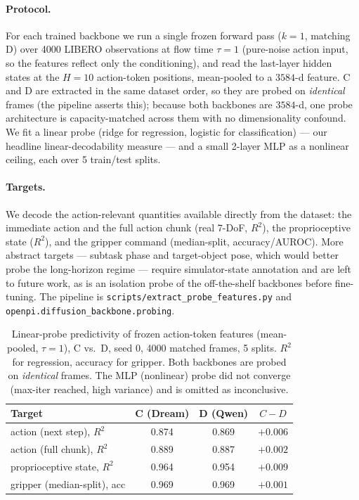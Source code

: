 \documentclass[conference]{IEEEtran}
\begin{document}
\paragraph{Protocol.} For each trained backbone we run a single frozen forward
pass ($k{=}1$, matching D) over 4000 LIBERO observations at flow time $\tau{=}1$
(pure-noise action input, so the features reflect only the conditioning), and read
the last-layer hidden states at the $H{=}10$ action-token positions, mean-pooled
to a $3584$-d feature. C and D are extracted in the same dataset order, so they are
probed on \emph{identical} frames (the pipeline asserts this); because both
backbones are $3584$-d, one probe architecture is capacity-matched across them with
no dimensionality confound. We fit a linear probe (ridge for regression, logistic
for classification) --- our headline linear-decodability measure --- and a small
2-layer MLP as a nonlinear ceiling, each over 5 train/test splits.

\paragraph{Targets.} We decode the action-relevant quantities available directly
from the dataset: the immediate action and the full action chunk (real 7-DoF,
$R^2$), the proprioceptive state ($R^2$), and the gripper command (median-split,
accuracy/AUROC). More abstract targets --- subtask phase and target-object pose,
which would better probe the long-horizon regime --- require simulator-state
annotation and are left to future work, as is an isolation probe of the
off-the-shelf backbones before fine-tuning. The pipeline is
\texttt{scripts/extract\_probe\_features.py} and
\texttt{openpi.diffusion\_backbone.probing}.

\begin{table}[t]
\centering
\caption{Linear-probe predictivity of frozen action-token features (mean-pooled,
$\tau{=}1$), C vs.\ D, seed 0, 4000 matched frames, 5 splits. $R^2$ for
regression, accuracy for gripper. Both backbones are probed on \emph{identical}
frames. The MLP (nonlinear) probe did not converge (max-iter reached, high
variance) and is omitted as inconclusive.}
\label{tab:probing}
\begin{tabular}{lccc}
\toprule
Target & C (Dream) & D (Qwen) & $C-D$ \\
\midrule
action (next step), $R^2$      & 0.874 & 0.869 & $+0.006$ \\
action (full chunk), $R^2$     & 0.889 & 0.887 & $+0.002$ \\
proprioceptive state, $R^2$    & 0.964 & 0.954 & $+0.009$ \\
gripper (median-split), acc    & 0.969 & 0.969 & $+0.001$ \\
\bottomrule
\end{tabular}
\end{table}
\end{document}
